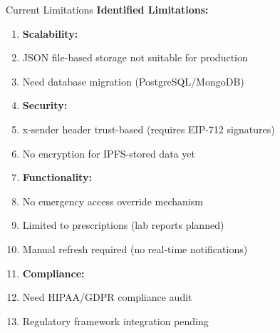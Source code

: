 \documentclass[10pt]{beamer}
\let\olditemize\itemize
\let\endolditemize\enditemize
\renewenvironment{itemize}
  {\olditemize\justifying}
  {\endolditemize}
\begin{document}
\begin{frame}{Current Limitations}
\textbf{Identified Limitations:}

\begin{enumerate}
\item \textbf{Scalability:}
    \begin{itemize}
    \item JSON file-based storage not suitable for production
    \item Need database migration (PostgreSQL/MongoDB)
    \end{itemize}

\item \textbf{Security:}
    \begin{itemize}
    \item x-sender header trust-based (requires EIP-712 signatures)
    \item No encryption for IPFS-stored data yet
    \end{itemize}

\item \textbf{Functionality:}
    \begin{itemize}
    \item No emergency access override mechanism
    \item Limited to prescriptions (lab reports planned)
    \item Manual refresh required (no real-time notifications)
    \end{itemize}

\item \textbf{Compliance:}
    \begin{itemize}
    \item Need HIPAA/GDPR compliance audit
    \item Regulatory framework integration pending
    \end{itemize}
\end{enumerate}
\end{frame}
\end{document}
